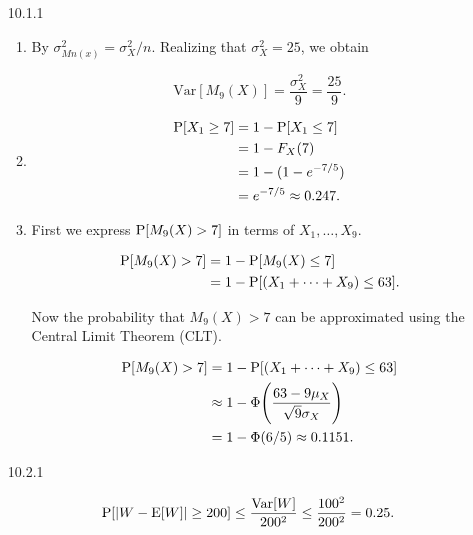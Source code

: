 \documentclass{article}
\begin{document}
\begin{enumerate}
\begin{enumerate}[label=(\alph*)]
    \end{enumerate}

    \item [10.1.1]

    \begin{enumerate}[label=(\alph*)]
        \item

        By $\sigma_{Mn(x)}^2 = \sigma_X^2 / n$. Realizing that $\sigma_X^2 = 25$, we obtain

        $$\text{Var}[M_9(X)] = \frac{\sigma_X^2}{9} = \frac{25}{9}.$$

        \item

        \begin{align*}
        \text P[X_1 \ge 7]
            & = 1 - \text P[X_1 \le 7] \\
            & = 1 - F_X(7) \\
            & = 1 - (1 - e^{-7 / 5}) \\
            & = e^{-7 / 5} \approx 0.247.
        \end{align*}

        \item

        First we express $\text P[M_9(X) > 7]$ in terms of $X_1, \dots, X_9$.

        \begin{align*}
        \text P[M_9(X) > 7] & = 1 - \text P[M_9(X) \le 7] \\
        & = 1 - \text P[(X_1 + \cdots + X_9) \le 63].
        \end{align*}

        Now the probability that $M_9(X) > 7$ can be approximated using the Central Limit Theorem (CLT).

        \begin{align*}
        \text P[M_9(X) > 7] & = 1 - \text P[(X_1 + \cdots + X_9) \le 63] \\
        & \approx 1 - \Phi\Bigg(\frac{63 - 9\mu_X}{\sqrt 9 \sigma_X}\Bigg) \\
        & = 1 - \Phi(6 / 5) \approx 0.1151.
        \end{align*}

    \end{enumerate}

    \item [10.2.1]

    $$\text P[|W - \text E[W]| \ge 200] \le \frac{\text{Var}[W]}{200^2} \le \frac{100^2}{200^2} = 0.25.$$


\end{enumerate}
\end{document}
